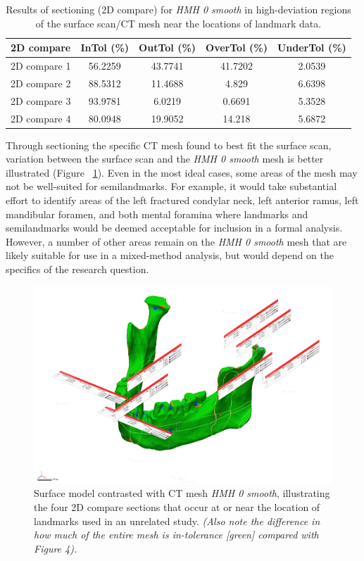 \documentclass[review]{elsarticle}
\begin{document}
\begin{table}[tbh]\centering
\footnotesize
\caption{Results of sectioning (2D compare) for \textit{HMH 0 smooth} in high-deviation regions of the surface scan/CT mesh near the locations of landmark data.}
\centering
\begin{tabular}{lcccc}
\hline
2D compare & InTol (\%) & OutTol (\%) & OverTol (\%) & UnderTol (\%)\\
\hline
2D compare 1 & 56.2259 & 43.7741 & 41.7202 & 2.0539\\
2D compare 2 & 88.5312 & 11.4688 & 4.829 & 6.6398\\
2D compare 3 & 93.9781 & 6.0219 & 0.6691 & 5.3528\\
2D compare 4 & 80.0948 & 19.9052 & 14.218 & 5.6872\\
\hline
\end{tabular}
\label{tab:Tbl3}
\end{table}

Through sectioning the specific CT mesh found to best fit the surface scan, variation between the surface scan and the \textit{HMH 0 smooth} mesh is better illustrated (Figure ~\ref{fig:Fig6}). Even in the most ideal cases, some areas of the mesh may not be well-suited for semilandmarks. For example, it would take substantial effort to identify areas of the left fractured condylar neck, left anterior ramus, left mandibular foramen, and both mental foramina where landmarks and semilandmarks would be deemed acceptable for inclusion in a formal analysis. However, a number of other areas remain on the \textit{HMH 0 smooth} mesh that are likely suitable for use in a mixed-method analysis, but would depend on the specifics of the research question.

\begin{figure}[ht]\centering
\includegraphics[width=\linewidth]{Fig6}
\caption{Surface model contrasted with CT mesh \textit{HMH 0 smooth}, illustrating the four 2D compare sections that occur at or near the location of landmarks used in an unrelated study. \textit{(Also note the difference in how much of the entire mesh is in-tolerance [green] compared with Figure 4).}}
\label{fig:Fig6}
\end{figure}
\end{document}
